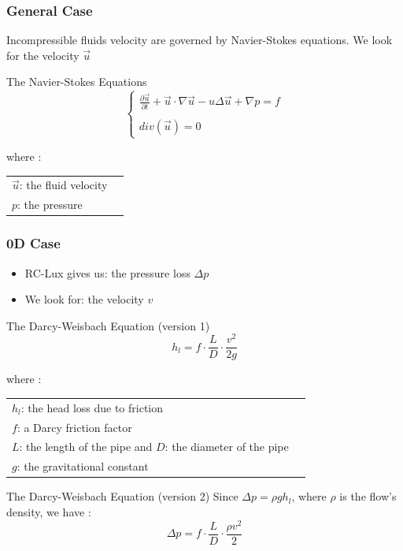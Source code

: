 \documentclass[xcolor=dvipsnames,10pt]{beamer}
\begin{document}
\begin{frame}
	\frametitle{General Case}
		Incompressible fluids velocity are governed by Navier-Stokes equations. 
		We look for the velocity $\vec{u}$ 
		\begin{block}{The Navier-Stokes Equations}
			\begin{equation}
				\left\{ \begin{array}{cl}
				\frac{\partial \vec{u}}{\partial t} + \vec{u}\cdot \nabla \vec{u} - u\Delta\vec{u} + \nabla p = f \\
			\\
				div(\vec{u}) = 0
				\end{array}
				\right.
			\end{equation}
		\end{block}
		where : 
	\begin{tabular}{ll}
		$\vec{u}$: the fluid velocity\\
		$p$: the pressure\\
	\end{tabular}
\end{frame}

\begin{frame}
	\frametitle{0D Case}
		{\footnotesize
		\begin{itemize}
			\item RC-Lux gives us: the pressure loss $\Delta p$ 
			\item We look for: the velocity $v$ 
		\end{itemize}
		\begin{block}{The Darcy-Weisbach Equation (version 1)}
			\begin{equation}
				h_l = f \cdot \frac{L}{D} \cdot \frac{v^2}{2g}
			\end{equation}
		\end{block}
		where : 
	\begin{tabular}{ll}
		$h_l$: the head loss due to friction\\
		$f$: a Darcy friction factor\\
		$L$: the length of the pipe and $D$: the diameter of the pipe\\
		$g$: the gravitational constant
	\end{tabular}
		\begin{block}{The Darcy-Weisbach Equation (version 2)}
			Since $\Delta p = \rho g h_l$, where $\rho$ is the flow's density, we have :
			\begin{equation}
				\Delta p = f \cdot \frac{L}{D} \cdot \frac{\rho v^2}{2}
			\end{equation}
		\end{block}
}
\end{frame}
\end{document}
